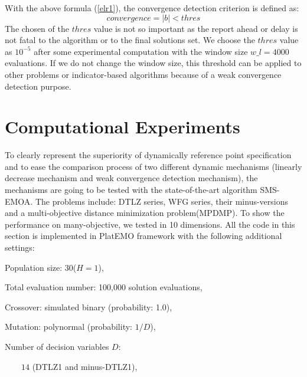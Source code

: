 \documentclass[conference]{IEEEtran}
\begin{document}
With the above formula (\ref{elr1}), the convergence detection criterion is defined as:
\begin{equation}\label{elr2}
  convergence = \lvert b \rvert < thres
\end{equation}
The chosen of the $thres$ value is not so important 
as the report ahead or delay is not fatal to the algorithm or to the final solutions set.
We choose the $thres$ value as $10^{-5}$ after some experimental computation with 
the window size $w\_ l = 4000$ evaluations. 
If we do not change the window size, 
this threshold can be applied to other problems or indicator-based algorithms
because of a weak convergence detection purpose.

% 
% 
%
\section{Computational Experiments}
To clearly represent the superiority of dynamically reference point specification 
and to ease the comparison process of two different dynamic mechanisms
(linearly decrease mechanism and weak convergence detection mechanism), 
the mechanisms are going to be tested with the state-of-the-art algorithm SMS-EMOA\cite{smsemoa}.
The problems include: 
DTLZ series\cite{DTLZ}, WFG series\cite{WFG}, their minus-versions\cite{minusTestProblem} 
and a multi-objective distance minimization problem(MPDMP)\cite{dmp}.
To show the performance on many-objective, we tested in 10 dimensions.
All the code in this section is implemented in PlatEMO framework\cite{PlatEMO} 
with the following additional settings:

Population size: 30($H=1$), 

Total evaluation number: 100,000 solution evaluations,

Crossover: simulated binary (probability: 1.0),

Mutation: polynormal (probability: $1/D$),

Number of decision variables $D$:

$\qquad 14$ (DTLZ1 and minus-DTLZ1),
\end{document}
